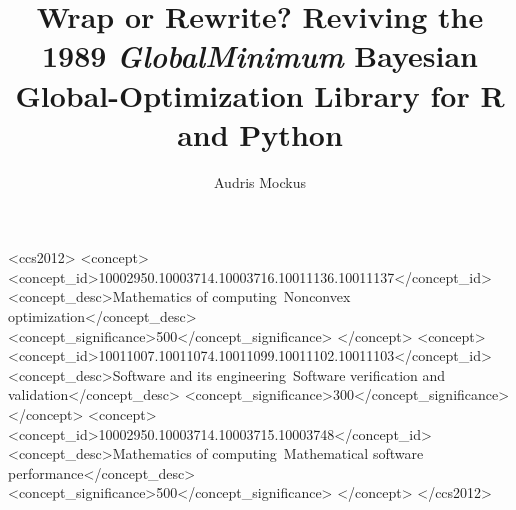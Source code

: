 \documentclass[acmsmall,screen,review]{acmart}
\begin{document}
\title[Wrap or Rewrite? Reviving the 1989 GlobalMinimum Library]{Wrap
or Rewrite? Reviving the 1989 \emph{GlobalMinimum} Bayesian
Global-Optimization Library for R and Python}

\author{Audris Mockus}

\begin{abstract}

\end{abstract}

\begin{CCSXML}
<ccs2012>
<concept>
<concept_id>10002950.10003714.10003716.10011136.10011137</concept_id>
<concept_desc>Mathematics of computing~Nonconvex optimization</concept_desc>
<concept_significance>500</concept_significance>
</concept>
<concept>
<concept_id>10011007.10011074.10011099.10011102.10011103</concept_id>
<concept_desc>Software and its engineering~Software verification and validation</concept_desc>
<concept_significance>300</concept_significance>
</concept>
<concept>
<concept_id>10002950.10003714.10003715.10003748</concept_id>
<concept_desc>Mathematics of computing~Mathematical software performance</concept_desc>
<concept_significance>500</concept_significance>
</concept>
</ccs2012>
\end{CCSXML}



\maketitle





\end{document}

